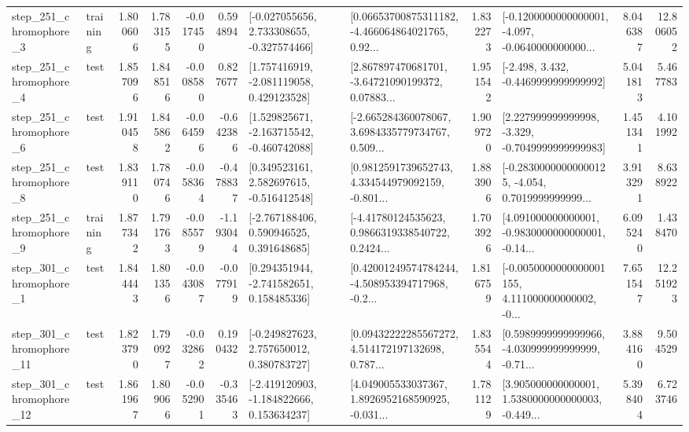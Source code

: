 \begin{tabular}{llrrrrllrlrr}
   step\_251\_chromophore\_3 &  training &      1.800606 &    1.783155 &     -0.017450 &  0.594894 &   [-0.027055656, 2.733308655, -0.327574466] &  [0.06653700875311182, -4.466064864021765, 0.92... &       1.832273 &  [-0.1200000000000001, -4.097, -0.0640000000000... &            8.046387 &         12.806052 \\
   step\_251\_chromophore\_4 &      test &      1.857096 &    1.848516 &     -0.008580 &  0.827677 &    [1.757416919, -2.081119058, 0.429123528] &  [2.867897470681701, -3.64721090199372, 0.07883... &       1.951542 &               [-2.498, 3.432, -0.4469999999999992] &            5.041813 &          5.467783 \\
   step\_251\_chromophore\_6 &      test &      1.910458 &    1.845862 &     -0.064596 & -0.642386 &   [1.529825671, -2.163715542, -0.460742088] &  [-2.665284360078067, 3.6984335779734767, 0.509... &       1.909720 &   [2.227999999999998, -3.329, -0.7049999999999983] &            1.451341 &          4.101992 \\
   step\_251\_chromophore\_8 &      test &      1.839110 &    1.780746 &     -0.058364 & -0.478837 &    [0.349523161, 2.582697615, -0.516412548] &  [0.9812591739652743, 4.334544979092159, -0.801... &       1.883906 &  [-0.28300000000000125, -4.054, 0.7019999999999... &            3.913291 &          8.638922 \\
   step\_251\_chromophore\_9 &  training &      1.877342 &    1.791763 &     -0.085579 & -1.193044 &    [-2.767188406, 0.590946525, 0.391648685] &  [-4.41780124535623, 0.9866319338540722, 0.2424... &       1.703926 &  [4.091000000000001, -0.9830000000000001, -0.14... &            6.095240 &          1.438470 \\
   step\_301\_chromophore\_1 &      test &      1.844443 &    1.801356 &     -0.043087 & -0.077919 &    [0.294351944, -2.741582651, 0.158485336] &  [0.42001249574784244, -4.508953394717968, -0.2... &       1.816759 &  [-0.0050000000000001155, 4.111000000000002, -0... &            7.651547 &         12.251923 \\
  step\_301\_chromophore\_11 &      test &      1.823790 &    1.790927 &     -0.032862 &  0.190432 &    [-0.249827623, 2.757650012, 0.380783727] &  [0.09432222285567272, 4.514172197132698, 0.787... &       1.835544 &  [0.5989999999999966, -4.030999999999999, -0.71... &            3.884160 &          9.504529 \\
  step\_301\_chromophore\_12 &      test &      1.861967 &    1.809066 &     -0.052901 & -0.335463 &   [-2.419120903, -1.184822666, 0.153634237] &  [4.049005533037367, 1.8926952168590925, -0.031... &       1.781129 &  [3.905000000000001, 1.5380000000000003, -0.449... &            5.398404 &          6.723746 \\

\end{tabular}
